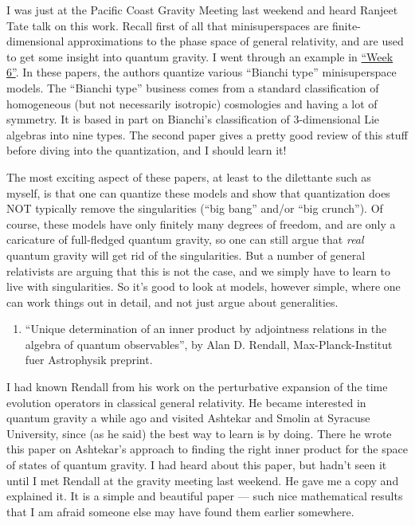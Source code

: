 \documentclass{article}
\def\tightlist{}
\begin{document}
I was just at the Pacific Coast Gravity Meeting last weekend and heard
Ranjeet Tate talk on this work. Recall first of all that minisuperspaces
are finite-dimensional approximations to the phase space of general
relativity, and are used to get some insight into quantum gravity. I
went through an example in \protect\hyperlink{week6}{``Week 6''}. In
these papers, the authors quantize various ``Bianchi type''
minisuperspace models. The ``Bianchi type'' business comes from a
standard classification of homogeneous (but not necessarily isotropic)
cosmologies and having a lot of symmetry. It is based in part on
Bianchi's classification of 3-dimensional Lie algebras into nine types.
The second paper gives a pretty good review of this stuff before diving
into the quantization, and I should learn it!

The most exciting aspect of these papers, at least to the dilettante
such as myself, is that one can quantize these models and show that
quantization does NOT typically remove the singularities (``big bang''
and/or ``big crunch''). Of course, these models have only finitely many
degrees of freedom, and are only a caricature of full-fledged quantum
gravity, so one can still argue that \emph{real} quantum gravity will
get rid of the singularities. But a number of general relativists are
arguing that this is not the case, and we simply have to learn to live
with singularities. So it's good to look at models, however simple,
where one can work things out in detail, and not just argue about
generalities.

\begin{enumerate}
\def\labelenumi{\arabic{enumi})}
\setcounter{enumi}{2}
\tightlist
\item
  ``Unique determination of an inner product by adjointness relations in
  the algebra of quantum observables'', by Alan D. Rendall,
  Max-Planck-Institut fuer Astrophysik preprint.
\end{enumerate}

I had known Rendall from his work on the perturbative expansion of the
time evolution operators in classical general relativity. He became
interested in quantum gravity a while ago and visited Ashtekar and
Smolin at Syracuse University, since (as he said) the best way to learn
is by doing. There he wrote this paper on Ashtekar's approach to finding
the right inner product for the space of states of quantum gravity. I
had heard about this paper, but hadn't seen it until I met Rendall at
the gravity meeting last weekend. He gave me a copy and explained it. It
is a simple and beautiful paper --- such nice mathematical results that
I am afraid someone else may have found them earlier somewhere.
\end{document}
